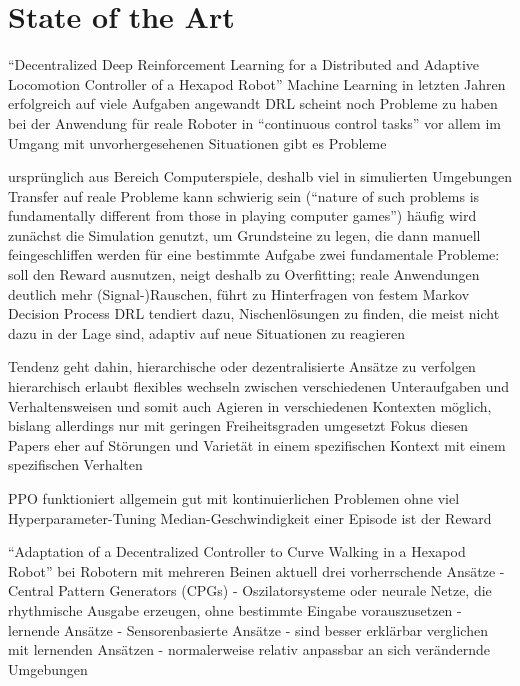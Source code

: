 \chapter{State of the Art}


\enquote{Decentralized Deep Reinforcement Learning for a Distributed and
Adaptive Locomotion Controller of a Hexapod Robot}
Machine Learning in letzten Jahren erfolgreich auf viele Aufgaben angewandt
DRL scheint noch Probleme zu haben bei der Anwendung für reale Roboter in \enquote{continuous control tasks}
vor allem im Umgang mit unvorhergesehenen Situationen gibt es Probleme

ursprünglich aus Bereich Computerspiele, deshalb viel in simulierten Umgebungen
Transfer auf reale Probleme kann schwierig sein (\enquote{nature of such problems is fundamentally different from those in playing computer games})
häufig wird zunächst die Simulation genutzt, um Grundsteine zu legen, die dann manuell feingeschliffen werden für eine bestimmte Aufgabe
zwei fundamentale Probleme: soll den Reward ausnutzen, neigt deshalb zu Overfitting; reale Anwendungen deutlich mehr (Signal-)Rauschen, führt zu Hinterfragen von festem Markov Decision Process
DRL tendiert dazu, Nischenlösungen zu finden, die meist nicht dazu in der Lage sind, adaptiv auf neue Situationen zu reagieren

Tendenz geht dahin, hierarchische oder dezentralisierte Ansätze zu verfolgen
hierarchisch erlaubt flexibles wechseln zwischen verschiedenen Unteraufgaben und Verhaltensweisen und somit auch Agieren in verschiedenen Kontexten möglich, bislang allerdings nur mit geringen Freiheitsgraden umgesetzt
Fokus diesen Papers eher auf Störungen und Varietät in einem spezifischen Kontext mit einem spezifischen Verhalten

PPO funktioniert allgemein gut mit kontinuierlichen Problemen ohne viel Hyperparameter-Tuning
Median-Geschwindigkeit einer Episode ist der Reward
\cite{schilling2020decentralized}



\enquote{Adaptation of a Decentralized Controller to Curve Walking in a Hexapod Robot}
bei Robotern mit mehreren Beinen aktuell drei vorherrschende Ansätze
- Central Pattern Generators (CPGs)
    - Oszilatorsysteme oder neurale Netze, die rhythmische Ausgabe erzeugen, ohne bestimmte Eingabe vorauszusetzen
- lernende Ansätze
- Sensorenbasierte Ansätze
    - sind besser erklärbar verglichen mit lernenden Ansätzen
    - normalerweise relativ anpassbar an sich verändernde Umgebungen

